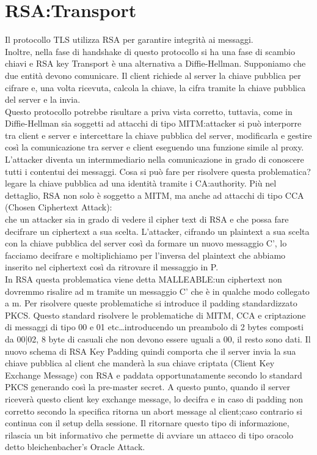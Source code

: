 \documentclass[a4paper,draft]{article}
\begin{document}
\section{RSA:\@Key Transport}
Il protocollo TLS utilizza RSA per garantire integrità ai messaggi\@.\\
Inoltre, nella fase di handshake di questo protocollo si ha una fase di scambio chiavi e RSA key Transport è una alternativa a Diffie-Hellman\@.\newline
Supponiamo che due entità devono comunicare\@. Il client richiede al server la chiave pubblica per cifrare e, una volta ricevuta, calcola la chiave, la cifra tramite la chiave pubblica del server e la invia\@.\\
Questo protocollo potrebbe risultare a priva vista corretto, tuttavia, come in Diffie-Hellman sia soggetti ad attacchi di tipo MITM:\@un attacker si può interporre tra client e server e intercettare la chiave pubblica del server, modificarla e gestire così la comunicazione tra server e client eseguendo una funzione simile al proxy\@. L'attacker diventa un intermmediario nella comunicazione in grado di conoscere tutti i contentui dei messaggi\@.\newline
Cosa si può fare per risolvere questa problematica?\@Occorre legare la chiave pubblica ad una identità tramite i CA:\@certificate authority\@.\newline
Più nel dettaglio, RSA non solo è soggetto a MITM, ma anche ad attacchi di tipo CCA (Chosen Ciphertext Attack):\\ \@supponiamo che un attacker sia in grado di vedere il cipher text di RSA e che possa fare decifrare un ciphertext a sua scelta\@. L'attacker, cifrando un plaintext a sua scelta con la chiave pubblica del server così da formare un nuovo messaggio C', lo facciamo decifrare e moltiplichiamo per l'inversa del plaintext che abbiamo inserito nel ciphertext così da ritrovare il messaggio in P\@.\\ In RSA questa problematica viene detta MALLEABLE:\@noto un ciphertext non dovremmo risalire ad m tramite un messaggio C' che è in qualche modo collegato a m\@.\newline
Per risolvere queste problematiche si introduce il padding standardizzato PKCS\@. Questo standard risolvere le problematiche di MITM, CCA e criptazione di messaggi di tipo 00 e 01 etc\dots introducendo un preambolo di 2 bytes composti da 00|02, 8 byte di casuali che non devono essere uguali a 00, il resto sono dati\@.\newline
Il nuovo schema di RSA Key Padding quindi comporta che il server invia la sua chiave pubblica al client che manderà la sua chiave criptata (Client Key Exchange Message) con RSA e paddata opportunatamente secondo lo standard PKCS generando così la pre-master secret\@. A questo punto, quando il server riceverà questo client key exchange message, lo decifra e in caso di padding non corretto secondo la specifica ritorna un abort message al client;\@in caso contrario si continua con il setup della sessione\@.\newline
Il ritornare questo tipo di informazione, rilascia un bit informativo che permette di avviare un attacco di tipo oracolo detto bleichenbacher's Oracle Attack\@.
\end{document}
